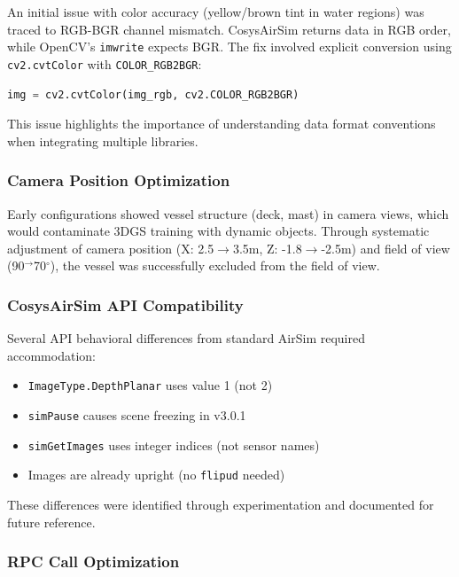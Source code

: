 An initial issue with color accuracy (yellow/brown tint in water regions) was traced to RGB-BGR channel mismatch. CosysAirSim returns data in RGB order, while OpenCV's \texttt{imwrite} expects BGR. The fix involved explicit conversion using \texttt{cv2.cvtColor} with \texttt{COLOR\_RGB2BGR}:

\begin{lstlisting}[language=Python]
img = cv2.cvtColor(img_rgb, cv2.COLOR_RGB2BGR)
\end{lstlisting}

This issue highlights the importance of understanding data format conventions when integrating multiple libraries.

\subsubsection{Camera Position Optimization}

Early configurations showed vessel structure (deck, mast) in camera views, which would contaminate 3DGS training with dynamic objects. Through systematic adjustment of camera position (X: 2.5$\rightarrow$3.5m, Z: -1.8$\rightarrow$-2.5m) and field of view (90$^\rightarrow$70$^\circ$), the vessel was successfully excluded from the field of view.

\subsubsection{CosysAirSim API Compatibility}

Several API behavioral differences from standard AirSim required accommodation:

\begin{itemize}
    \item \texttt{ImageType.DepthPlanar} uses value 1 (not 2)
    \item \texttt{simPause} causes scene freezing in v3.0.1
    \item \texttt{simGetImages} uses integer indices (not sensor names)
    \item Images are already upright (no \texttt{flipud} needed)
\end{itemize}

These differences were identified through experimentation and documented for future reference.

\subsubsection{RPC Call Optimization}

